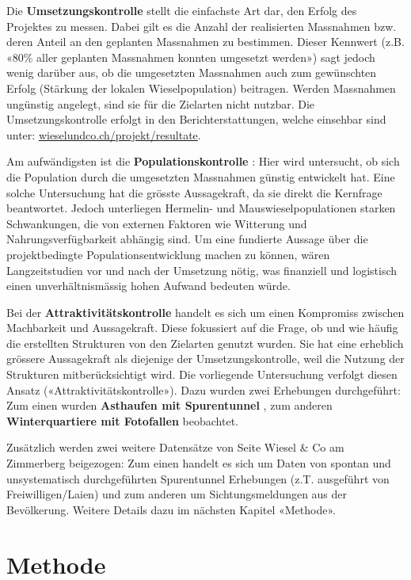 \documentclass[
  oneside]{scrbook}
\begin{document}
Die \textbf{Umsetzungskontrolle} stellt die einfachste Art dar, den Erfolg des Projektes zu messen. Dabei gilt es die Anzahl der realisierten Massnahmen bzw. deren Anteil an den geplanten Massnahmen zu bestimmen. Dieser Kennwert (z.B. «80\% aller geplanten Massnahmen konnten umgesetzt werden») sagt jedoch wenig darüber aus, ob die umgesetzten Massnahmen auch zum gewünschten Erfolg (Stärkung der lokalen Wieselpopulation) beitragen. Werden Massnahmen ungünstig angelegt, sind sie für die Zielarten nicht nutzbar. Die Umsetzungskontrolle erfolgt in den Berichterstattungen, welche einsehbar sind unter: \href{http://www.wieselundco.ch/projekt/resultate}{wieselundco.ch/projekt/resultate}.

Am aufwändigsten ist die \textbf{Populationskontrolle} : Hier wird untersucht, ob sich die Population durch die umgesetzten Massnahmen günstig entwickelt hat. Eine solche Untersuchung hat die grösste Aussagekraft, da sie direkt die Kernfrage beantwortet. Jedoch unterliegen Hermelin- und Mauswieselpopulationen starken Schwankungen, die von externen Faktoren wie Witterung und Nahrungsverfügbarkeit abhängig sind. Um eine fundierte Aussage über die projektbedingte Populationsentwicklung machen zu können, wären Langzeitstudien vor und nach der Umsetzung nötig, was finanziell und logistisch einen unverhältnismässig hohen Aufwand bedeuten würde.

Bei der \textbf{Attraktivitätskontrolle} handelt es sich um einen Kompromiss zwischen Machbarkeit und Aussagekraft. Diese fokussiert auf die Frage, ob und wie häufig die erstellten Strukturen von den Zielarten genutzt wurden. Sie hat eine erheblich grössere Aussagekraft als diejenige der Umsetzungskontrolle, weil die Nutzung der Strukturen mitberücksichtigt wird. Die vorliegende Untersuchung verfolgt diesen Ansatz («Attraktivitätskontrolle»). Dazu wurden zwei Erhebungen durchgeführt: Zum einen wurden \textbf{Asthaufen mit Spurentunnel} , zum anderen \textbf{Winterquartiere mit Fotofallen} beobachtet.

Zusätzlich werden zwei weitere Datensätze von Seite Wiesel \& Co am Zimmerberg beigezogen: Zum einen handelt es sich um Daten von spontan und unsystematisch durchgeführten Spurentunnel Erhebungen (z.T. ausgeführt von Freiwilligen/Laien) und zum anderen um Sichtungsmeldungen aus der Bevölkerung. Weitere Details dazu im nächsten Kapitel «Methode».

\hypertarget{methode}{%
\chapter{Methode}\label{methode}}
\end{document}
